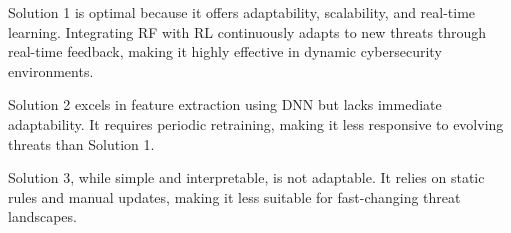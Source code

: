 

Solution 1 is optimal because it offers adaptability, scalability, and real-time learning. 
Integrating RF with RL continuously adapts to new threats through real-time feedback, making it highly effective in dynamic cybersecurity environments.

Solution 2 excels in feature extraction using DNN but lacks immediate adaptability. 
It requires periodic retraining, making it less responsive to evolving threats than Solution 1.

Solution 3, while simple and interpretable, is not adaptable. 
It relies on static rules and manual updates, making it less suitable for fast-changing threat landscapes.

